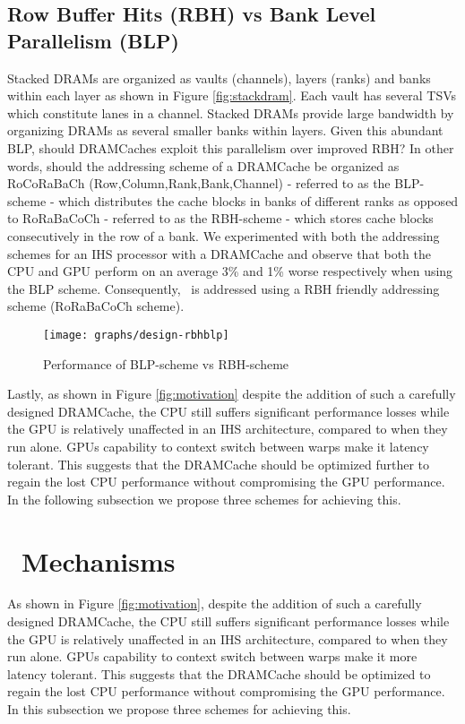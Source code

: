 \subsection{Row Buffer Hits (RBH) vs Bank Level Parallelism (BLP)} 
Stacked DRAMs are organized as vaults (channels), layers (ranks) and banks within each layer as shown in Figure \ref{fig:stackdram}. Each vault has several TSVs which constitute lanes in a channel. Stacked DRAMs provide large bandwidth by organizing DRAMs as several smaller banks within layers. Given this abundant BLP, should DRAMCaches exploit this parallelism over improved RBH? In other words, should the addressing scheme of a DRAMCache be organized as RoCoRaBaCh (Row,Column,Rank,Bank,Channel) - referred to as the BLP-scheme - which distributes the cache blocks in banks of different ranks as opposed to RoRaBaCoCh - referred to as the RBH-scheme - which stores cache blocks consecutively in the row of a bank. We experimented with both the addressing schemes for an IHS processor with a DRAMCache and observe that both the CPU and GPU perform on an average 3\% and 1\% worse respectively when using the BLP scheme. Consequently, \cachename\ is addressed using a RBH friendly addressing scheme (RoRaBaCoCh scheme). 

\begin{figure}[htbp]
	\centering
   \texttt{[image: graphs/design-rbhblp]}
   \caption{Performance of BLP-scheme vs RBH-scheme}
   \label{fig:design-rbhblp}
\end{figure}

\par Lastly, as shown in Figure \ref{fig:motivation} despite the addition of such a carefully designed DRAMCache, the CPU still suffers significant performance losses while the GPU is relatively unaffected in an IHS architecture, compared to when they run alone. GPUs capability to context switch between warps make it latency tolerant. This suggests that the DRAMCache should be optimized further to regain the lost CPU performance without compromising the GPU performance. In the following subsection we propose three schemes for achieving this.


\section{\cachename\ Mechanisms}

As shown in Figure \ref{fig:motivation}, despite the addition of such a carefully designed DRAMCache, the CPU still suffers significant performance losses while the GPU is relatively unaffected in an IHS architecture, compared to when they run alone. GPUs capability to context switch between warps make it more latency tolerant. This suggests that the DRAMCache should be optimized to regain the lost CPU performance without compromising the GPU performance. In this subsection we propose three schemes for achieving this.


